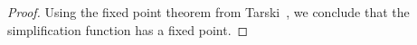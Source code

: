 \begin{proof}
	Using the fixed point theorem from Tarski~\cite{tarski1955lattice}, 
	we conclude that the simplification function has a
	fixed point.
%	
\end{proof}

